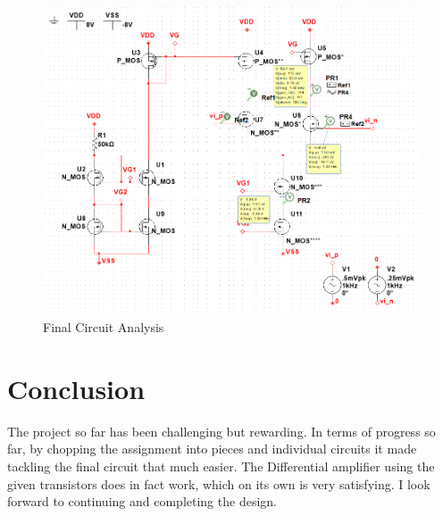 \documentclass[12pt]{article}
\begin{document}
\begin{figure}[h]
	\label{fig:amp}
	\caption{Final Circuit Analysis}
	\centering
	\includegraphics[width=1\textwidth]{finalamp}
\end{figure}



\section{Conclusion}
The project so far has been challenging but rewarding. In terms of progress so far, by chopping the assignment into pieces and individual circuits it made tackling the final circuit that much easier. The Differential amplifier using the given transistors does in fact work, which on its own is very satisfying. I look forward to continuing and completing the design.
\end{document}
